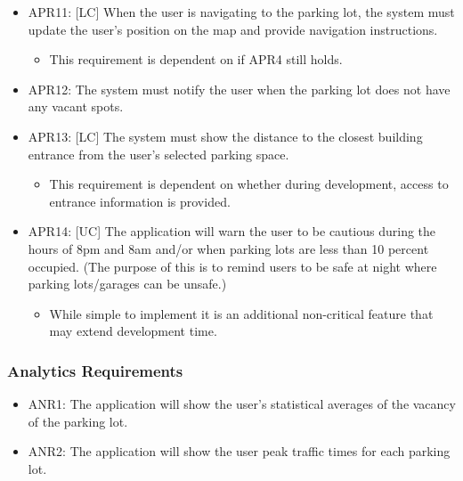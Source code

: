 \documentclass[]{article}
\begin{document}
\begin{itemize}
		\item APR11: [LC] When the user is navigating to the parking lot, the system must update the user’s position on the map and provide navigation instructions.
		\begin{itemize}
			\item This requirement is dependent on if APR4 still holds.
		\end{itemize}
		
		\item APR12: The system must notify the user when the parking lot does not have any vacant spots.
		
		\item APR13: [LC] The system must show the distance to the closest building entrance from the user’s selected parking space.
		\begin{itemize}
			\item This requirement is dependent on whether during development, access to entrance information is provided.
		\end{itemize}
		
		
		\item APR14: [UC] The application will warn the user to be cautious during the hours of 8pm and 8am and/or when parking lots are less than 10 percent occupied. (The purpose of this is to remind users to be safe at night where parking lots/garages can be unsafe.)
		\begin{itemize}
			\item While simple to implement it is an additional non-critical feature that may extend development time.
		\end{itemize}
	\end{itemize}
\subsubsection{Analytics Requirements}
\begin{itemize}
	\item ANR1: The application will show the user’s statistical averages of the vacancy of the parking lot. 
	\item ANR2: The application will show the user peak traffic times for each parking lot.
\end{itemize}
\end{document}
